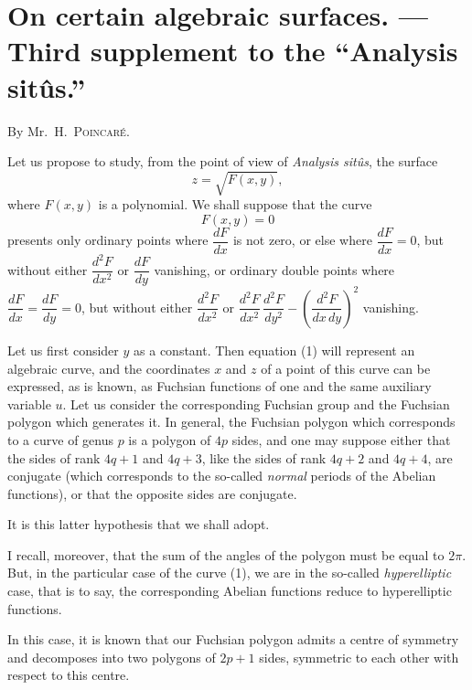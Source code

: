 \documentclass{article}
\begin{document}

\section*{On certain algebraic surfaces. --- Third supplement to the “Analysis sitûs.”}

By Mr.~H.~\textsc{Poincaré}.

Let us propose to study, from the point of view of \emph{Analysis sitûs}, the surface
\[ z = \sqrt{F(x, y)}, \tag{1} \]
where $F(x, y)$ is a polynomial. We shall suppose that the curve
\[ F(x, y) = 0 \]
presents only ordinary points where $\dfrac{dF}{dx}$ is not zero, or else where $\dfrac{dF}{dx} = 0$, but without either $\dfrac{d^{2}F}{dx^{2}}$ or $\dfrac{dF}{dy}$ vanishing, or ordinary double points where $\dfrac{dF}{dx} = \dfrac{dF}{dy} = 0$, but without either $\dfrac{d^{2}F}{dx^{2}}$ or $\dfrac{d^{2}F}{dx^{2}}\,\dfrac{d^{2}F}{dy^{2}} - \left(\dfrac{d^{2}F}{dx\,dy}\right)^{2}$ vanishing.

Let us first consider $y$ as a constant. Then equation (1) will represent an algebraic curve, and the coordinates $x$ and $z$ of a point of this curve can be expressed, as is known, as Fuchsian functions of one and the same auxiliary variable $u$. Let us consider the corresponding Fuchsian group and the Fuchsian polygon which generates it. In general, the Fuchsian polygon which corresponds to a curve of genus $p$ is a polygon of $4p$ sides, and one may suppose either that the sides of rank $4q + 1$ and $4q + 3$, like the sides of rank $4q + 2$ and $4q + 4$, are conjugate (which corresponds to the so-called \emph{normal} periods of the Abelian functions), or that the opposite sides are conjugate.

It is this latter hypothesis that we shall adopt.

I recall, moreover, that the sum of the angles of the polygon must be equal to $2\pi$. But, in the particular case of the curve (1), we are in the so-called \emph{hyperelliptic} case, that is to say, the corresponding Abelian functions reduce to hyperelliptic functions.


In this case, it is known that our Fuchsian polygon admits a centre of symmetry and decomposes into two polygons of $2p + 1$ sides, symmetric to each other with respect to this centre.
\end{document}
